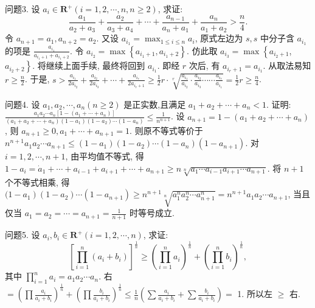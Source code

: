 问题3. 设 $a_i \in \mathbf{R}^{+}(i=1,2, \cdots, n, n \geqslant 2)$, 求证:
$$
\frac{a_1}{a_2+a_3}+\frac{a_2}{a_3+a_4}+\cdots+\frac{a_{n-1}}{a_n+a_1}+\frac{a_n}{a_1+a_2}>\frac{n}{4} .
$$
令 $a_{n+1}=a_1, a_{n+2}=a_2$. 又设 $a_{i_1}=\max _{1 \leqslant i \leqslant n} a_i$, 原式左边为 $s, s$ 中分子含 $a_{i_1}$ 的项是 $\frac{a_{i_1}}{a_{i_1+1}+a_{i_1+2}}$. 令 $a_{i_2}=\max \left\{a_{i_1+1}, a_{i_1+2}\right\}$. 仿此取 $a_{i_3}=\max \left\{a_{i_2+1}\right.$, $\left.a_{i_2+2}\right\}$. 将继续上面手续, 最终将回到 $a_{i_1}$. 即经 $r$ 次后, 有 $a_{i_r+1}=a_{i_1}$. 从取法易知 $r \geqslant \frac{n}{2}$. 于是, $s>\frac{a_{i_1}}{2 a_{i_2}}+\frac{a_{i_2}}{2 a_{i_3}}+\cdots+\frac{a_{i_r}}{2 a_{i_r+1}} \geqslant \frac{1}{2} r \cdot \sqrt[r]{\frac{a_{i_1}}{a_{i_2}} \cdot \frac{a_{i_2}}{a_{i_3}} \cdots \cdots \frac{a_{i_r}}{a_{i_1}}}= \frac{1}{2} r \geqslant \frac{n}{4}$.



问题4. 设 $a_1, a_2, \cdots, a_n(n \geqslant 2)$ 是正实数,且满足 $a_1+a_2+\cdots+a_n<1$. 证明: $\frac{a_1 a_2 \cdots a_n\left[1-\left(a_1+\cdots+a_n\right)\right]}{\left(a_1+a_2+\cdots+a_n\right)\left(1-a_1\right)\left(1-a_2\right) \cdots\left(1-a_n\right)} \leqslant \frac{1}{n^{n+1}}$.
设 $a_{n+1}=1-\left(a_1+a_2+\cdots+a_n\right)$, 则 $a_{n+1} \geqslant 0, a_1+\cdots+a_{n+1}=1$. 则原不等式等价于 $n^{n+1} a_1 a_2 \cdots a_{n+1} \leqslant\left(1-a_1\right)\left(1-a_2\right) \cdots\left(1-a_n\right)\left(1-a_{n+1}\right)$. 对 $i=1,2, \cdots, n+1$, 由平均值不等式, 得 $1-a_i=\dot{a}_1+\cdots+a_{i-1}+ a_{i+1}+\cdots+a_{n+1} \geqslant n \sqrt[n]{a_1 \cdots a_{i-1} a_{i+1} \cdots a_{n+1}}$. 将 $n+1$ 个不等式相乘, 得 $(1- \left.a_1\right)\left(1-a_2\right) \cdots\left(1-a_{n+1}\right) \geqslant n^{n+1} \sqrt[n]{a_1^n a_2^n \cdots a_{n+1}^n}=n^{n+1} a_1 a_2 \cdots a_{n+1}$, 当且仅当 $a_1=a_2=\cdots=a_{n+1}=\frac{1}{n+1}$ 时等号成立.



问题5. 设 $a_i, b_i \in \mathbf{R}^{+}(i=1,2, \cdots, n)$, 求证:
$$
\left[\prod_{i=1}^n\left(a_i+b_i\right)\right]^{\frac{1}{n}} \geqslant\left(\prod_{i=1}^n a_i\right)^{\frac{1}{n}}+\left(\prod_{i=1}^n b_i\right)^{\frac{1}{n}},
$$
其中 $\prod_{i=1}^n a_i=a_1 a_2 \cdots a_n$.
右 $=\left(\prod \frac{a_i}{a_i+b_i}\right)^{\frac{1}{n}}+\left(\prod \frac{b_i}{a_i+b_i}\right)^{\frac{1}{n}} \leqslant \frac{1}{n}\left(\sum \frac{a_i}{a_i+b_i}+\sum \frac{b_i}{a_i+b_i}\right)=$ 1. 所以左 $\geqslant$ 右.




